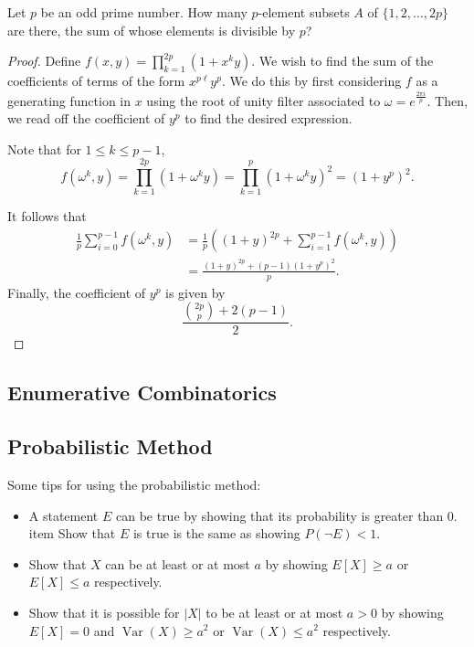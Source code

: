 \documentclass[11pt]{article}
\renewcommand{\>}{\rangle}
\newcommand{\<}{\langle}
\newcommand{\Var}{\operatorname{Var}}
\begin{document}
\begin{problem}[IMO 1995/6] Let $p$ be an odd prime number. How many $p$-element subsets $ A$ of $ \{1,2,\dots,2p\}$ are there, the sum of whose elements is divisible by $p$?
\end{problem}
\begin{proof}
Define $f(x, y) = \prod_{k=1}^{2p} (1 + x^k y)$.  We wish to find the sum of the coefficients of terms of the form $x^{p \ell} y^p$.  We do this by first considering $f$ as a generating function in $x$ using the root of unity filter associated to $\omega = e^{\frac{2\pi i }{p}}$.   Then, we read off the coefficient of $y^p$ to find the desired expression.

Note that for $1 \le k \le p-1$, 
$$f(\omega^k, y) = \prod_{k=1}^{2p} (1 + \omega^k y) = \prod_{k=1}^{p} (1 + \omega^k y)^2 = (1 + y^p)^2.$$

It follows that 
\begin{align*}
\frac{1}{p} \sum_{i=0}^{p-1} f(\omega^k, y) &= \frac{1}{p} \left ((1 +y)^{2p} + \sum_{i=1}^{p-1} f(\omega^k, y) \right) \\
&= \frac{(1 + y)^{2p} + (p-1)(1 + y^p)^2}{p}.
\end{align*}
Finally, the coefficient of $y^p$ is given by 
$$\frac{\binom{2p}{p} + 2(p-1)}{2}.$$
\end{proof}

\subsection{Enumerative Combinatorics}

\subsection{Probabilistic Method}


Some tips for using the probabilistic method:
\begin{itemize}
\item A statement $E$ can be true by showing that its probability is greater than $0$.
item Show that $E$ is true is the same as showing $P(\lnot E) < 1$.
\item Show that $X$ can be at least or at most $a$ by showing $E[X] \ge a$ or $E[X] \le a$ respectively.
\item Show that it is possible for $|X|$ to be at least or at most $a > 0$ by showing $E[X] = 0$ and $\Var(X) \ge a^2$ or $\Var(X) \le a^2$ respectively.
\end{itemize}
\end{document}
